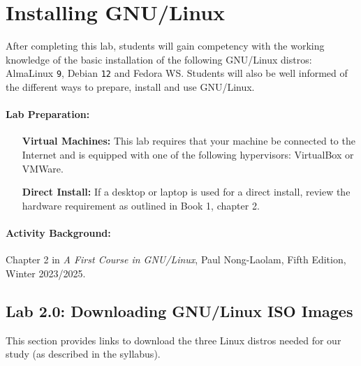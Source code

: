 \section{\Large{Installing GNU/Linux}}

After completing this lab, students will gain competency with the working knowledge of the basic installation of the following GNU/Linux distros: AlmaLinux {\tt{9}}, Debian {\tt{12}} and Fedora WS. Students will also be well informed of the different ways to prepare, install and use GNU/Linux. 

\paragraph{Lab Preparation: } 

\begin{itemize}
   \item[{\bf{Virtual Machines:}}] This lab requires that your machine be connected to the Internet and is equipped with one of the following hypervisors: VirtualBox or VMWare.
   \item[{\bf{Direct Install:}}] If a desktop or laptop is used for a direct install, review the hardware requirement as outlined in Book 1, chapter 2. 
\end{itemize}

\paragraph{Activity Background: } Chapter 2 in {\it{A First Course in GNU/Linux}}, Paul Nong-Laolam, Fifth Edition, Winter 2023/2025.

\subsection*{Lab 2.0: Downloading GNU/Linux ISO Images}
This section provides links to download the three Linux distros needed for our study (as described in the syllabus). 

